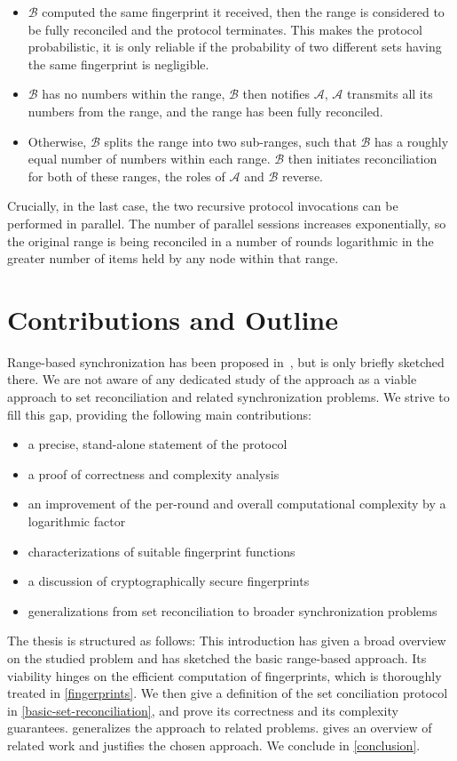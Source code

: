 \begin{itemize}
\item
  $\mathcal{B}$ computed the same fingerprint it received, then the range is considered to be fully reconciled and the protocol terminates. This makes the protocol probabilistic, it is only reliable if the probability of two different sets having the same fingerprint is negligible.
\item
  $\mathcal{B}$ has no numbers within the range, $\mathcal{B}$ then notifies $\mathcal{A}$, $\mathcal{A}$
  transmits all its numbers from the range, and the range has been
  fully reconciled.
\item
  Otherwise, $\mathcal{B}$ splits the range into two sub-ranges, such that $\mathcal{B}$
  has a roughly equal number of numbers within each range. $\mathcal{B}$ then
  initiates reconciliation for both of these ranges, the roles of $\mathcal{A}$ and
  $\mathcal{B}$ reverse.
\end{itemize}

Crucially, in the last case, the two recursive protocol invocations can
be performed in parallel. The number of parallel sessions increases
exponentially, so the original range is being reconciled in a number
of rounds logarithmic in the greater number of items held by any node
within that range.

\section{Contributions and Outline}

Range-based synchronization has been proposed in~\cite{chen1999prototype}, but is only briefly sketched there. We are not aware of any dedicated study of the approach as a viable approach to set reconciliation and related synchronization problems. We strive to fill this gap, providing the following main contributions:

\begin{itemize}
\item a precise, stand-alone statement of the protocol
\item a proof of correctness and complexity analysis
\item an improvement of the per-round and overall computational complexity by a logarithmic factor
\item characterizations of suitable fingerprint functions
\item a discussion of cryptographically secure fingerprints
\item generalizations from set reconciliation to broader synchronization problems
\end{itemize}

The thesis is structured as follows: This introduction has given a broad overview on the studied problem and has sketched the basic range-based approach. Its viability hinges on the efficient computation of fingerprints, which is thoroughly treated in \cref{fingerprints}. We then give a definition of the set
conciliation protocol in \cref{basic-set-reconciliation}, and prove its correctness and its
complexity guarantees.  generalizes the approach to related problems. 
gives an overview of related work and justifies the chosen approach. We
conclude in \cref{conclusion}.